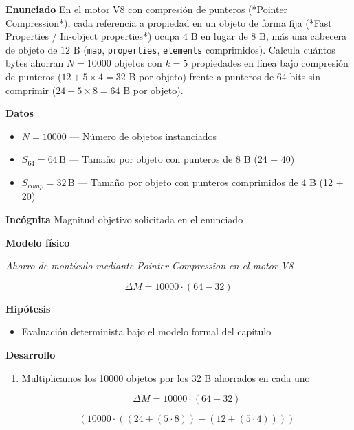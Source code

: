 \documentclass{book}
\begin{document}
\begin{tcolorbox}[title={Problema resuelto}, studiumworked, breakable]

\noindent\textbf{Enunciado}
En el motor V8 con compresión de punteros (*Pointer Compression*), cada referencia a propiedad en un objeto de forma fija (*Fast Properties / In-object properties*) ocupa \(4\text{ B}\) en lugar de \(8\text{ B}\), más una cabecera de objeto de \(12\text{ B}\) (\texttt{map}, \texttt{properties}, \texttt{elements} comprimidos). Calcula cuántos bytes ahorran \(N = 10000\) objetos con \(k = 5\) propiedades en línea bajo compresión de punteros (\(12 + 5 \times 4 = 32\text{ B}\) por objeto) frente a punteros de 64 bits sin comprimir (\(24 + 5 \times 8 = 64\text{ B}\) por objeto).

\noindent\textbf{Datos}
\begin{itemize}
\item $N = 10000$ — Número de objetos instanciados
\item $S_{64} = 64\,\mathrm{B}$ — Tamaño por objeto con punteros de 8 B (24 + 40)
\item $S_{comp} = 32\,\mathrm{B}$ — Tamaño por objeto con punteros comprimidos de 4 B (12 + 20)
\end{itemize}

\noindent\textbf{Incógnita}
Magnitud objetivo solicitada en el enunciado

\noindent\textbf{Modelo físico}

\noindent\textit{Ahorro de montículo mediante Pointer Compression en el motor V8}

\[
\Delta M = 10000 \cdot (64 - 32)
\]

\noindent\textbf{Hipótesis}
\begin{itemize}
\item Evaluación determinista bajo el modelo formal del capítulo
\end{itemize}

\noindent\textbf{Desarrollo}
\begin{enumerate}
\item
Multiplicamos los 10000 objetos por los 32 B ahorrados en cada uno

\[
\Delta M = 10000 \cdot (64 - 32)
\]

\[
\left(10000\cdot \left(\left(24+\left(5\cdot 8\right)\right)-\left(12+\left(5\cdot 4\right)\right)\right)\right)
\]
\end{enumerate}


\end{tcolorbox}
\end{document}
